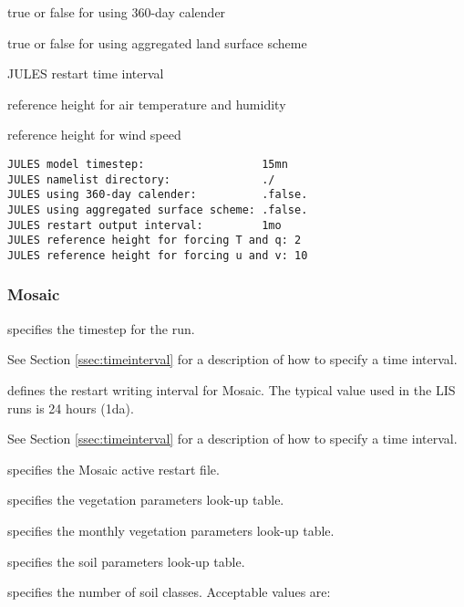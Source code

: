   true or false for using 360-day calender

  true or false for using aggregated land surface scheme

  JULES restart time interval

  reference height for air temperature and humidity

  reference height for wind speed
 

 \begin{Verbatim}[frame=single]
JULES model timestep:                  15mn 
JULES namelist directory:              ./
JULES using 360-day calender:          .false. 
JULES using aggregated surface scheme: .false. 
JULES restart output interval:         1mo
JULES reference height for forcing T and q: 2 
JULES reference height for forcing u and v: 10 
 \end{Verbatim}
 


 
 \subsubsection{Mosaic} \label{sssec:lsm_mosaic}
 

 
  specifies the timestep for the run.

 See Section \ref{ssec:timeinterval} for a description
 of how to specify a time interval.

  defines the restart
 writing interval for Mosaic.  The typical value used in the
 LIS runs is 24 hours (1da).

 See Section \ref{ssec:timeinterval} for a description
 of how to specify a time interval.

  specifies the Mosaic active restart file.

  specifies the vegetation
 parameters look-up table.

  specifies the
 monthly vegetation parameters look-up table.

  specifies the soil
 parameters look-up table.

  specifies the number of soil
 classes.
 Acceptable values are:

